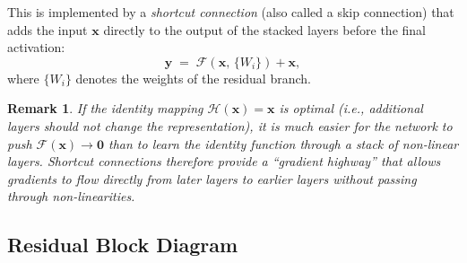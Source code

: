 \documentclass[12pt,a4paper]{article}
\newtheorem{remark}{Remark}[section]
\begin{document}
This is implemented by a \emph{shortcut connection} (also called a skip connection) that adds the input $\mathbf{x}$ directly to the output of the stacked layers before the final activation:
\begin{equation}
  \mathbf{y} \;=\; \mathcal{F}(\mathbf{x},\, \{W_i\}) + \mathbf{x},
  \label{eq:shortcut}
\end{equation}
where $\{W_i\}$ denotes the weights of the residual branch.

\begin{remark}
If the identity mapping $\mathcal{H}(\mathbf{x}) = \mathbf{x}$ is optimal (i.e., additional layers should not change the representation), it is much easier for the network to push $\mathcal{F}(\mathbf{x}) \to \mathbf{0}$ than to learn the identity function through a stack of non-linear layers. Shortcut connections therefore provide a ``gradient highway'' that allows gradients to flow directly from later layers to earlier layers without passing through non-linearities.
\end{remark}

\subsection{Residual Block Diagram}
\end{document}
